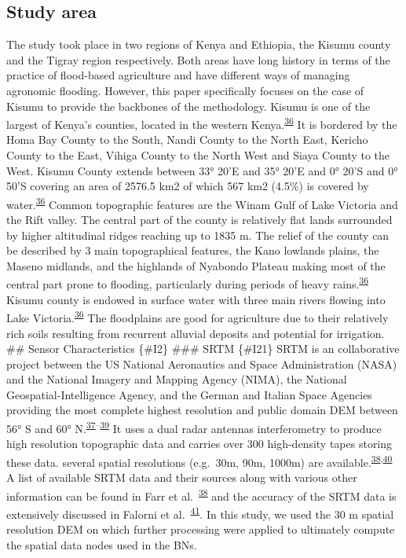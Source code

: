 \documentclass[12pt,oneside]{article}
\begin{document}
\hypertarget{I1}{%
\subsection{Study area}\label{I1}}

The study took place in two regions of Kenya and Ethiopia, the Kisumu county and the Tigray region respectively. Both areas have long history in terms of the practice of flood-based agriculture and have different ways of managing agronomic flooding. However, this paper specifically focuses on the case of Kisumu to provide the backbones of the methodology. Kisumu is one of the largest of Kenya's counties, located in the western Kenya.\textsuperscript{\protect\hyperlink{ref-KisumuCountyGovernment_2013}{36}} It is bordered by the Homa Bay County to the South, Nandi County to the North East, Kericho County to the East, Vihiga County to the North West and Siaya County to the West. Kisumu County extends between 33° 20'E and 35° 20'E and 0° 20'S and 0° 50'S covering an area of 2576.5 km2 of which 567 km2 (4.5\%) is covered by water.\textsuperscript{\protect\hyperlink{ref-KisumuCountyGovernment_2013}{36}} Common topographic features are the Winam Gulf of Lake Victoria and the Rift valley. The central part of the county is relatively flat lands surrounded by higher altitudinal ridges reaching up to 1835 m. The relief of the county can be described by 3 main topographical features, the Kano lowlands plains, the Maseno midlands, and the highlands of Nyabondo Plateau making most of the central part prone to flooding, particularly during periods of heavy rains.\textsuperscript{\protect\hyperlink{ref-KisumuCountyGovernment_2013}{36}} Kisumu county is endowed in surface water with three main rivers flowing into Lake Victoria.\textsuperscript{\protect\hyperlink{ref-KisumuCountyGovernment_2013}{36}} The floodplains are good for agriculture due to their relatively rich soils resulting from recurrent alluvial deposits and potential for irrigation.
\#\# Sensor Characteristics \{\#I2\}
\#\#\# SRTM \{\#I21\}
SRTM is an collaborative project between the US National Aeronautics and Space Administration (NASA) and the National Imagery and Mapping Agency (NIMA), the National Geospatial-Intelligence Agency, and the German and Italian Space Agencies providing the most complete highest resolution and public domain DEM between 56° S and 60° N.\textsuperscript{\protect\hyperlink{ref-Farr_et_al_2000}{37}--\protect\hyperlink{ref-Nikolakopoulos_et_al_2006}{39}} It uses a dual radar antennas interferometry to produce high resolution topographic data and carries over 300 high-density tapes storing these data. several spatial resolutions (e.g.~30m, 90m, 1000m) are available.\textsuperscript{\protect\hyperlink{ref-Farr_et_al_2007}{38},\protect\hyperlink{ref-Jarvis_et_al_2008}{40}} A list of available SRTM data and their sources along with various other information can be found in Farr et al.~\textsuperscript{\protect\hyperlink{ref-Farr_et_al_2007}{38}} and the accuracy of the SRTM data is extensively discussed in Falorni et al.~\textsuperscript{\protect\hyperlink{ref-Falorni_et_al_2005}{41}}. In this study, we used the 30 m spatial resolution DEM on which further processing were applied to ultimately compute the spatial data nodes used in the BNs.
\end{document}
